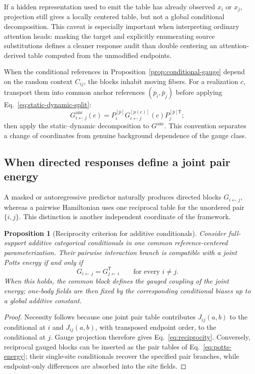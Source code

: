 \documentclass[10pt]{article}
\newtheorem{proposition}[theorem]{Proposition}
\theoremstyle{definition}
\theoremstyle{remark}
\newcommand{\BookSection}[1]{\subsection{#1}}
\begin{document}
If a hidden representation used to emit the table has already observed $x_i$ or $x_j$, projection
still gives a locally centered table, but not a global conditional decomposition.  This caveat is
especially important when interpreting ordinary attention heads: masking the target and explicitly
enumerating source substitutions defines a cleaner response audit than double centering an
attention-derived table computed from the unmodified endpoints.

When the conditional references in Proposition~\ref{prop:conditional-gauge} depend on the random
context $C_{ij}$, the blocks inhabit moving fibers.  For a realization $c$, transport them into
common anchor references
$(\bar p_i,\bar p_j)$ before applying Eq.~\ref{eq:static-dynamic-split}:
\begin{equation}
G_{i\leftarrow j}^{\mathrm{anc}}(c)
=P_i^{[\bar p]}G_{i\leftarrow j}^{[p(c)]}(c)P_j^{[\bar p]\mathsf T};
\label{eq:context-anchor-transport}
\end{equation}
then apply the static--dynamic decomposition to $G^{\mathrm{anc}}$.  This convention separates a
change of coordinates from genuine background dependence of the gauge class.

\BookSection{When directed responses define a joint pair energy}

A masked or autoregressive predictor naturally produces directed blocks
$G_{i\leftarrow j}$, whereas a pairwise Hamiltonian uses one reciprocal table for the unordered
pair $\{i,j\}$.  This distinction is another independent coordinate of the framework.

\begin{proposition}[Reciprocity criterion for additive conditionals]
\label{prop:reciprocity}
Consider full-support additive categorical conditionals in one common reference-centered parameterization.  Their
pairwise interaction branch is compatible with a joint Potts energy if and only if
\begin{equation}
G_{i\leftarrow j}=G_{j\leftarrow i}^{\mathsf T}
\qquad\text{for every }i\ne j.
\label{eq:reciprocity}
\end{equation}
When this holds, the common block defines the gauged coupling of the joint energy; one-body fields
are then fixed by the corresponding conditional biases up to a global additive constant.
\end{proposition}

\begin{proof}
Necessity follows because one joint pair table contributes $J_{ij}(a,b)$ to the conditional at
$i$ and $J_{ij}(a,b)$, with transposed endpoint order, to the conditional at $j$.  Gauge projection
therefore gives Eq.~\ref{eq:reciprocity}.  Conversely, reciprocal gauged blocks can be inserted as
the pair tables of Eq.~\ref{eq:potts-energy}; their single-site conditionals recover the specified
pair branches, while endpoint-only differences are absorbed into the site fields.
\end{proof}
\end{document}
